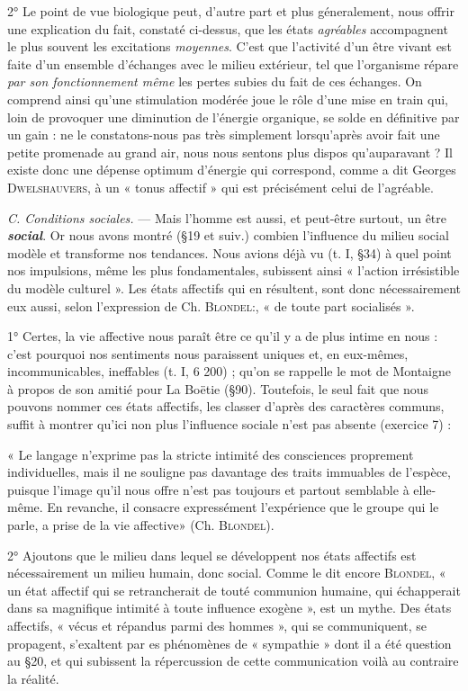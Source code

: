 2° Le point de vue biologique peut, d'autre part et plus géneralement,
nous offrir une explication du fait, constaté ci-dessus, que
les états {\it agréables} accompagnent le plus souvent les excitations
{\it moyennes}. C’est que l’activité d’un être vivant est faite d’un ensemble
d'échanges avec le milieu extérieur, tel que l’organisme répare {\it par
son fonctionnement même} les pertes subies du fait de ces échanges. On
comprend ainsi qu’une stimulation modérée joue le rôle d’une mise
en train qui, loin de provoquer une diminution de l’énergie organique,
se solde en définitive par un gain : ne le constatons-nous pas très
simplement lorsqu’après avoir fait une petite promenade au grand
air, nous nous sentons plus dispos qu'auparavant ? Il existe donc une
dépense optimum d’énergie qui correspond, comme a dit Georges
\textsc{Dwelshauvers}, à un « tonus affectif » qui est précisément celui de
l’agréable.

{\it C. Conditions sociales.} — Mais l’homme est aussi, et peut-être surtout,
un être \textbf{\textit {social}}. Or nous avons montré (\S 19 et suiv.) combien
l'influence du milieu social modèle et transforme nos tendances. Nous
avions déjà vu (t. I, \S 34) à quel point nos impulsions, même les plus
fondamentales, subissent ainsi « l’action irrésistible du modèle culturel ».
Les états affectifs qui en résultent, sont donc nécessairement
eux aussi, selon l’expression de Ch. \textsc{Blondel}:, « de toute part
socialisés ».

1° Certes, la vie affective nous paraît être ce qu’il y a de plus
intime en nous : c’est pourquoi nos sentiments nous paraissent uniques
et, en eux-mêmes, incommunicables, ineffables (t. I, 6 200) ; qu’on se
rappelle le mot de Montaigne à propos de son amitié pour La Boëtie
(\S 90). Toutefois, le seul fait que nous pouvons nommer ces états
affectifs, les classer d’après des caractères communs, suffit à montrer
qu’ici non plus l'influence sociale n’est pas absente (exercice 7) :

{\footnotesize
« Le langage n'exprime pas la stricte intimité des consciences proprement
individuelles, mais il ne souligne pas davantage des traits
immuables de l'espèce, puisque l’image qu’il nous offre n’est pas toujours
et partout semblable à elle-même. En revanche, il consacre expressément
l'expérience que le groupe qui le parle, a prise de la vie affective»
(Ch. \textsc{Blondel}).
}

2° Ajoutons que le milieu dans lequel se développent nos états
affectifs est nécessairement un milieu humain, donc social. Comme le
dit encore \textsc{Blondel}, « un état affectif qui se retrancherait de touté
communion humaine, qui échapperait dans sa magnifique intimité
à toute influence exogène », est un mythe. Des états affectifs, « vécus
et répandus parmi des hommes », qui se communiquent, se propagent,
s’exaltent par es phénomènes de « sympathie » dont il a été question
au \S 20, et qui subissent la répercussion de cette communication
voilà au contraire la réalité.

